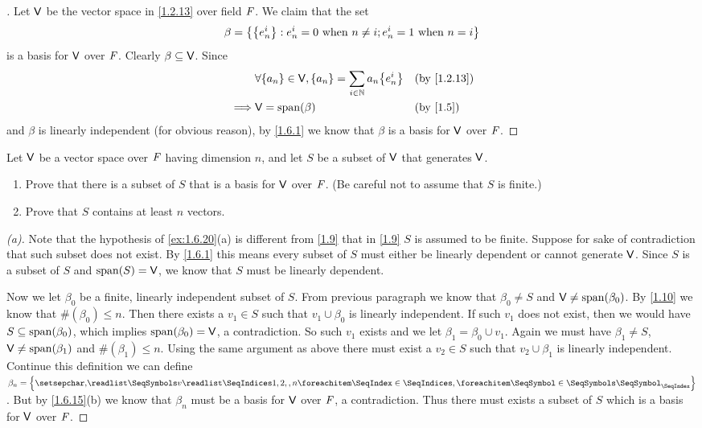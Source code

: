 \begin{proof}[]
	Let \(\mathsf{V}\) be the vector space in \cref{1.2.13} over field \(\mathit{F}\).
	We claim that the set
	\[
		\beta = \left\lbrace\left\lbrace e_n^i\right\rbrace : e_n^i = 0 \text{ when } n \neq i ; e_n^i = 1 \text{ when } n = i\right\rbrace
	\]
	is a basis for \(\mathsf{V}\) over \(\mathit{F}\).
	Clearly \(\beta \subseteq \mathsf{V}\).
	Since
	\begin{align*}
		         & \forall \set{a_n} \in \V, \set{a_n} = \sum_{i \in \N} a_n \set{e_n^i} &  & \by{1.2.13} \\
		\implies & \V = \spn{\beta}                                                      &  & \by{1.5}
	\end{align*}
	and \(\beta\) is linearly independent (for obvious reason), by \cref{1.6.1} we know that \(\beta\) is a basis for \(\mathsf{V}\) over \(\mathit{F}\).
\end{proof}

\setcounter{ex}{19}
\begin{ex}\label{ex:1.6.20}
	Let \(\mathsf{V}\) be a vector space over \(\mathit{F}\) having dimension \(n\), and let \(S\) be a subset of \(\mathsf{V}\) that generates \(\mathsf{V}\).
	\begin{enumerate}
		\item Prove that there is a subset of \(S\) that is a basis for \(\mathsf{V}\) over \(\mathit{F}\).
		      (Be careful not to assume that \(S\) is finite.)
		\item Prove that \(S\) contains at least \(n\) vectors.
	\end{enumerate}
\end{ex}

\begin{proof}[(a)]
	Note that the hypothesis of \cref{ex:1.6.20}(a) is different from \cref{1.9} that in \cref{1.9} \(S\) is assumed to be finite.
	Suppose for sake of contradiction that such subset does not exist.
	By \cref{1.6.1} this means every subset of \(S\) must either be linearly dependent or cannot generate \(\mathsf{V}\).
	Since \(S\) is a subset of \(S\) and \(\spn{S} = \V\), we know that \(S\) must be linearly dependent.

	Now we let \(\beta_0\) be a finite, linearly independent subset of \(S\).
	From previous paragraph we know that \(\beta_0 \neq S\) and \(\V \neq \spn{\beta_0}\).
	By \cref{1.10} we know that \(\#(\beta_0) \leq n\).
	Then there exists a \(v_1 \in S\) such that \(v_1 \cup \beta_0\) is linearly independent.
	If such \(v_1\) does not exist, then we would have \(S \subseteq \spn{\beta_0}\), which implies \(\spn{\beta_0} = \V\), a contradiction.
	So such \(v_1\) exists and we let \(\beta_1 = \beta_0 \cup v_1\).
	Again we must have \(\beta_1 \neq S\), \(\V \neq \spn{\beta_1}\) and \(\#(\beta_1) \leq n\).
	Using the same argument as above there must exist a \(v_2 \in S\) such that \(v_2 \cup \beta_1\) is linearly independent.
	Continue this definition we can define \(\beta_n = \set{\seq{v}{1,2,,n}}\).
	But by \cref{1.6.15}(b) we know that \(\beta_n\) must be a basis for \(\mathsf{V}\) over \(\mathit{F}\), a contradiction.
	Thus there must exists a subset of \(S\) which is a basis for \(\mathsf{V}\) over \(\mathit{F}\).
\end{proof}

